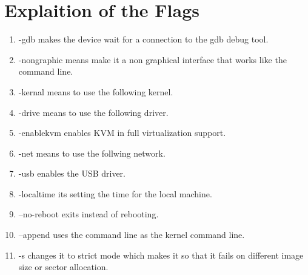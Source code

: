 \section{Explaition of the Flags}
\begin{enumerate}
\item \textcolor{povcodered}{-gdb} makes the device wait for a connection to the gdb debug tool.
\item \textcolor{povcodered}{-nongraphic} means make it a non graphical interface that works like the command line.
\item \textcolor{povcodered}{ -kernal} means to use the following kernel.
\item \textcolor{povcodered}{-drive} means to use the following driver.
\item \textcolor{povcodered}{-enablekvm} enables KVM in full virtualization support.
\item \textcolor{povcodered}{-net} means to use the follwing network.
\item \textcolor{povcodered}{-usb} enables the USB driver.
\item \textcolor{povcodered}{-localtime} its setting the time for the local machine.
\item \textcolor{povcodered}{--no-reboot} exits instead of rebooting. 
\item \textcolor{povcodered}{--append} uses the command line as the kernel command line.
\item \textcolor{povcodered}{-s} changes it to strict mode which makes it so that it fails on different image size or sector allocation.
\end{enumerate}

